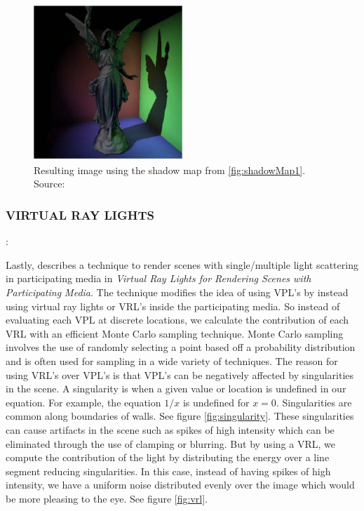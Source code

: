 \begin{figure}[h!]
  \centering
    \includegraphics[width=0.5\textwidth]{shadowMap2.jpg}
  \caption{Resulting image using the shadow map from \ref{fig:shadowMap1}. Source: \protect\cite{Dachsbacher2005}}
	\label{fig:shadowMap2}
\end{figure}

\subsubsection{VIRTUAL RAY LIGHTS}: 

Lastly, \cite{Novak2012} describes a technique to render scenes with single/multiple light scattering in participating media in \textit{Virtual Ray Lights for Rendering Scenes with Participating Media}.  The technique modifies the idea of using VPL's by instead using virtual ray lights or VRL's inside the participating media.  So instead of evaluating each VPL at discrete locations, we calculate the contribution of each VRL with an efficient Monte Carlo sampling technique.  Monte Carlo sampling involves the use of randomly selecting a point based off a probability distribution and is often used for sampling in a wide variety of techniques.  The reason for using VRL's over VPL's is that VPL's can be negatively affected by singularities in the scene.  A singularity is when a given value or location is undefined in our equation.  For example, the equation $1/x$ is undefined for $x=0$.  Singularities are common along boundaries of walls.  See figure \ref{fig:singularity}.  These singularities can cause artifacts in the scene such as spikes of high intensity which can be eliminated through the use of clamping or blurring.  But by using a VRL, we compute the contribution of the light by distributing the energy over a line segment reducing singularities.  In this case, instead of having spikes of high intensity, we have a uniform noise distributed evenly over the image which would be more pleasing to the eye.  See figure \ref{fig:vrl}.

